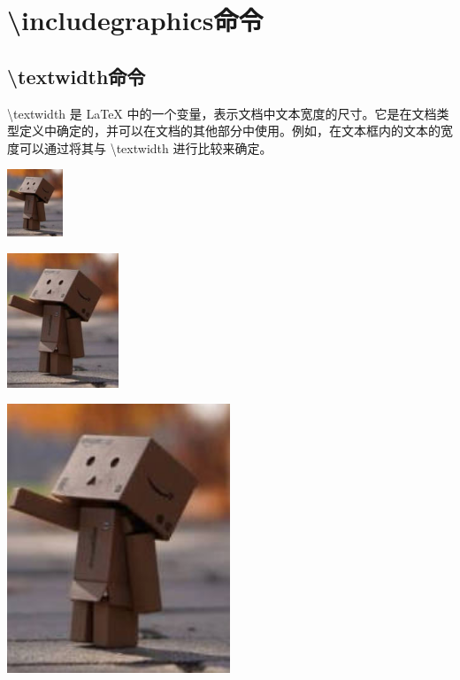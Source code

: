 \documentclass{article}
\begin{document}
	
	\section{\textbackslash includegraphics命令}
	\subsection{\textbackslash textwidth命令}
	\textbackslash textwidth 是 LaTeX 中的一个变量，表示文档中文本宽度的尺寸。它是在文档类型定义中确定的，并可以在文档的其他部分中使用。例如，在文本框内的文本的宽度可以通过将其与 \textbackslash textwidth 进行比较来确定。
	
	\includegraphics[width=0.125\textwidth]{test.jpg}
	
	\includegraphics[width=0.25\textwidth]{test.jpg}
	
	\includegraphics[width=0.5\textwidth]{test.jpg}
	
\end{document}
